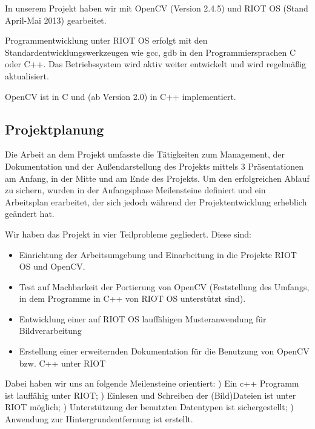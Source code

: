 \documentclass[10pt,a4paper]{article}
\begin{document}
In unserem Projekt haben wir mit OpenCV (Version 2.4.5) und RIOT OS (Stand April-Mai 2013) gearbeitet.  \newline

Programmentwicklung unter RIOT OS erfolgt mit den Standardentwicklungswerkzeugen wie gcc, gdb in den Programmiersprachen C oder C++. Das Betriebssystem wird aktiv weiter entwickelt und wird regelmäßig aktualisiert. \newline

OpenCV ist in C und (ab Version 2.0) in C++ implementiert. \newline

\subsection{Projektplanung}

Die Arbeit an dem Projekt umfasste die Tätigkeiten zum Management, der Dokumentation und der Außendarstellung des Projekts mittels 3 Präsentationen am Anfang, in der Mitte und am Ende des Projekts. Um den erfolgreichen Ablauf zu sichern, wurden in der Anfangsphase Meilensteine definiert und ein Arbeitsplan erarbeitet, der sich jedoch während der Projektentwicklung erheblich geändert hat. 

Wir haben das Projekt in vier Teilprobleme gegliedert. Diese sind:
\begin{itemize}
\item Einrichtung der Arbeitsumgebung und Einarbeitung in die Projekte RIOT OS und OpenCV.
\item Test auf Machbarkeit der Portierung von OpenCV (Feststellung des Umfangs, in dem Programme in C++ von RIOT OS unterstützt sind).
\item Entwicklung einer auf RIOT OS lauffähigen Musteranwendung für Bildverarbeitung
\item Erstellung einer erweiternden Dokumentation für die Benutzung von OpenCV bzw. C++ unter RIOT
\end{itemize}

Dabei haben wir uns an folgende Meilensteine orientiert: ) Ein c++ Programm ist lauffähig unter RIOT; ) Einlesen und Schreiben der (Bild)Dateien ist unter RIOT möglich; ) Unterstützung der benutzten Datentypen ist sichergestellt; ) Anwendung zur Hintergrundentfernung ist erstellt. \newline
\end{document}
